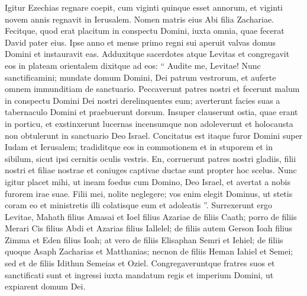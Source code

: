\begin{biblechapter}
\begin{biblechapter}
\begin{biblechapter}
\begin{biblechapter}
\begin{biblechapter}
\begin{biblechapter}
\begin{biblechapter}
\begin{biblechapter}
\begin{biblechapter}
\begin{biblechapter}
\begin{biblechapter}
\begin{biblechapter}
\begin{biblechapter}
\begin{biblechapter}
\begin{biblechapter}
\begin{biblechapter}
\begin{biblechapter}
\begin{biblechapter}
\begin{biblechapter}
\begin{biblechapter}
\begin{biblechapter}
\begin{biblechapter}
\begin{biblechapter}
\begin{biblechapter}
\begin{biblechapter}
\begin{biblechapter}
\begin{biblechapter}
\begin{biblechapter}
\begin{biblechapter}
\verse Igitur Ezechias regnare coepit, cum viginti quinque esset annorum, et viginti novem annis regnavit in Ierusalem. Nomen matris eius Abi filia Zachariae. 
\verse Fecitque, quod erat placitum in conspectu Domini, iuxta omnia, quae fecerat David pater eius.
 \verse Ipse anno et mense primo regni sui aperuit valvas domus Domini et instauravit eas. 
\verse Adduxitque sacerdotes atque Levitas et congregavit eos in plateam orientalem 
\verse dixitque ad eos: “ Audite me, Levitae! Nunc sanctificamini; mundate domum Domini, Dei patrum vestrorum, et auferte omnem immunditiam de sanctuario. 
\verse Peccaverunt patres nostri et fecerunt malum in conspectu Domini Dei nostri derelinquentes eum; averterunt facies suas a tabernaculo Domini et praebuerunt dorsum. 
\verse Insuper clauserunt ostia, quae erant in porticu, et exstinxerunt lucernas incensumque non adoleverunt et holocausta non obtulerunt in sanctuario Deo Israel. 
\verse Concitatus est itaque furor Domini super Iudam et Ierusalem; tradiditque eos in commotionem et in stuporem et in sibilum, sicut ipsi cernitis oculis vestris. 
\verse En, corruerunt patres nostri gladiis, filii nostri et filiae nostrae et coniuges captivae ductae sunt propter hoc scelus. 
\verse Nunc igitur placet mihi, ut ineam foedus cum Domino, Deo Israel, et avertat a nobis furorem irae suae. 
\verse Filii mei, nolite neglegere; vos enim elegit Dominus, ut stetis coram eo et ministretis illi colatisque eum et adoleatis ”.
 \verse Surrexerunt ergo Levitae, Mahath filius Amasai et Ioel filius Azariae de filiis Caath; porro de filiis Merari Cis filius Abdi et Azarias filius Iallelel; de filiis autem Gerson Ioah filius Zimma et Eden filius Ioah; 
\verse at vero de filiis Elisaphan Semri et Iehiel; de filiis quoque Asaph Zacharias et Matthanias; 
\verse necnon de filiis Heman Iahiel et Semei; sed et de filiis Idithun Semeias et Oziel. 
\verse Congregaveruntque fratres suos et sanctificati sunt et ingressi iuxta mandatum regis et imperium Domini, ut expiarent domum Dei. 

\end{biblechapter}
\end{biblechapter}
\end{biblechapter}
\end{biblechapter}
\end{biblechapter}
\end{biblechapter}
\end{biblechapter}
\end{biblechapter}
\end{biblechapter}
\end{biblechapter}
\end{biblechapter}
\end{biblechapter}
\end{biblechapter}
\end{biblechapter}
\end{biblechapter}
\end{biblechapter}
\end{biblechapter}
\end{biblechapter}
\end{biblechapter}
\end{biblechapter}
\end{biblechapter}
\end{biblechapter}
\end{biblechapter}
\end{biblechapter}
\end{biblechapter}
\end{biblechapter}
\end{biblechapter}
\end{biblechapter}
\end{biblechapter}
